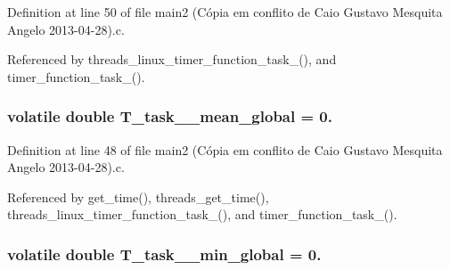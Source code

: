 Definition at line 50 of file main2 (\-Cópia em conflito de Caio Gustavo Mesquita Angelo 2013-\/04-\/28).\-c.



Referenced by threads\-\_\-linux\-\_\-timer\-\_\-function\-\_\-task\-\_(), and timer\-\_\-function\-\_\-task\-\_().

\hypertarget{main2_01_07C_xC3_xB3pia_01em_01conflito_01de_01Caio_01Gustavo_01Mesquita_01Angelo_012013-04-28_08_8c_a738c330c86a365e72ce29ebca3f1e572}{
\subsubsection[{T\-\_\-task\-\_\-1\-\_\-mean\-\_\-global}]{\setlength{\rightskip}{0pt plus 5cm}volatile double T\-\_\-task\-\_\-\_\-mean\-\_\-global = 0.}}\label{main2_01_07C_xC3_xB3pia_01em_01conflito_01de_01Caio_01Gustavo_01Mesquita_01Angelo_012013-04-28_08_8c_a738c330c86a365e72ce29ebca3f1e572}


Definition at line 48 of file main2 (\-Cópia em conflito de Caio Gustavo Mesquita Angelo 2013-\/04-\/28).\-c.



Referenced by get\-\_\-time(), threads\-\_\-get\-\_\-time(), threads\-\_\-linux\-\_\-timer\-\_\-function\-\_\-task\-\_(), and timer\-\_\-function\-\_\-task\-\_().

\hypertarget{main2_01_07C_xC3_xB3pia_01em_01conflito_01de_01Caio_01Gustavo_01Mesquita_01Angelo_012013-04-28_08_8c_a86222e255aeeb47598a4fc91ab6c2b1a}{
\subsubsection[{T\-\_\-task\-\_\-1\-\_\-min\-\_\-global}]{\setlength{\rightskip}{0pt plus 5cm}volatile double T\-\_\-task\-\_\-\_\-min\-\_\-global = 0.}}\label{main2_01_07C_xC3_xB3pia_01em_01conflito_01de_01Caio_01Gustavo_01Mesquita_01Angelo_012013-04-28_08_8c_a86222e255aeeb47598a4fc91ab6c2b1a}


